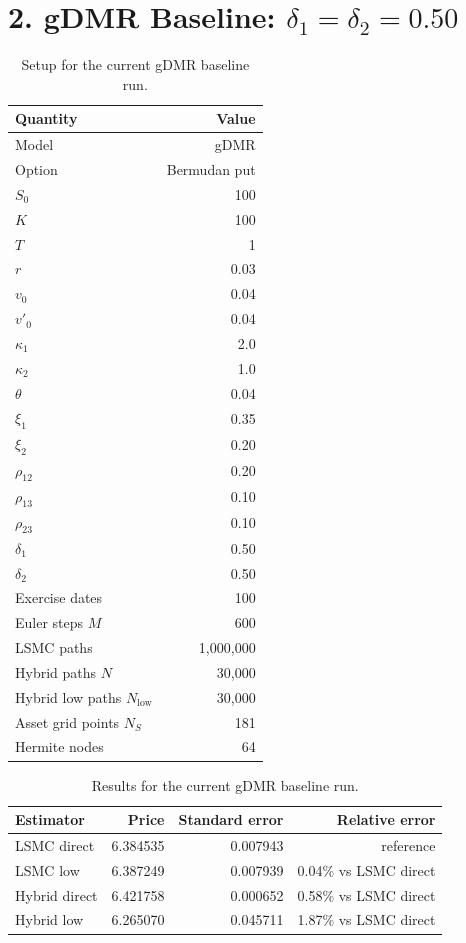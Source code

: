 \documentclass[11pt]{article}
\begin{document}
\section*{2. gDMR Baseline: $\delta_1=\delta_2=0.50$}

\begin{table}[ht]
\centering
\caption{Setup for the current gDMR baseline run.}
\begin{tabular}{lr}
\toprule
Quantity & Value \\
\midrule
Model & gDMR \\
Option & Bermudan put \\
$S_0$ & 100 \\
$K$ & 100 \\
$T$ & 1 \\
$r$ & 0.03 \\
$v_0$ & 0.04 \\
$v'_0$ & 0.04 \\
$\kappa_1$ & 2.0 \\
$\kappa_2$ & 1.0 \\
$\theta$ & 0.04 \\
$\xi_1$ & 0.35 \\
$\xi_2$ & 0.20 \\
$\rho_{12}$ & 0.20 \\
$\rho_{13}$ & 0.10 \\
$\rho_{23}$ & 0.10 \\
$\delta_1$ & 0.50 \\
$\delta_2$ & 0.50 \\
Exercise dates & 100 \\
Euler steps $M$ & 600 \\
LSMC paths & 1,000,000 \\
Hybrid paths $N$ & 30,000 \\
Hybrid low paths $N_{\mathrm{low}}$ & 30,000 \\
Asset grid points $N_S$ & 181 \\
Hermite nodes & 64 \\
\bottomrule
\end{tabular}
\end{table}

\begin{table}[ht]
\centering
\caption{Results for the current gDMR baseline run.}
\begin{tabular}{lrrr}
\toprule
Estimator & Price & Standard error & Relative error \\
\midrule
LSMC direct   & 6.384535 & 0.007943 & reference \\
LSMC low      & 6.387249 & 0.007939 & 0.04\% vs LSMC direct \\
Hybrid direct & 6.421758 & 0.000652 & 0.58\% vs LSMC direct \\
Hybrid low    & 6.265070 & 0.045711 & 1.87\% vs LSMC direct \\
\bottomrule
\end{tabular}
\end{table}
\end{document}
